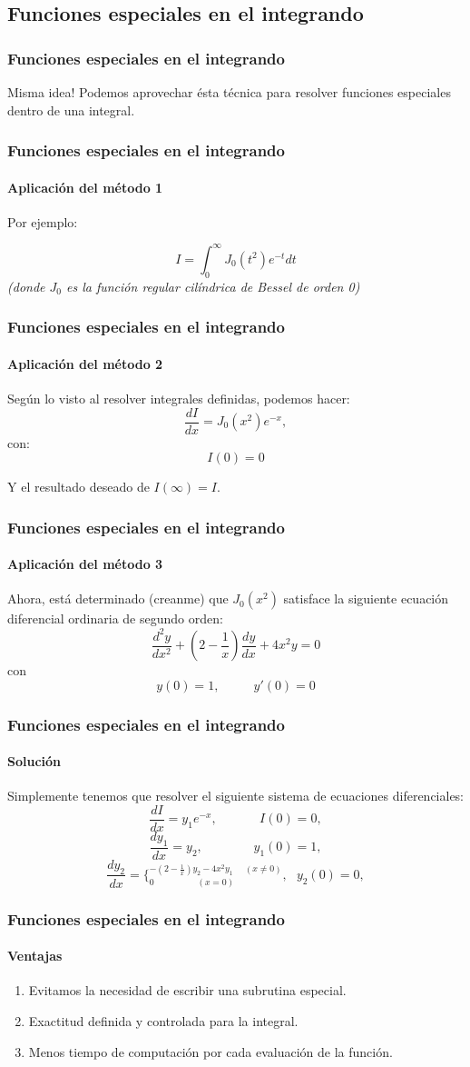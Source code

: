 \documentclass{beamer}
\begin{document}
\subsection{Funciones especiales en el integrando}
\frame
{
\frametitle{Funciones especiales en el integrando}

Misma idea!
Podemos aprovechar ésta técnica para resolver funciones especiales dentro de
una integral.

}
\frame
{
\frametitle{Funciones especiales en el integrando}
\framesubtitle{Aplicación del método 1}

Por ejemplo:

$$
	I	=	\int_0^\infty J_0 (t^2) e^{-t} dt
$$
\textit{(donde $J_0$ es la función regular cilíndrica de Bessel de orden 0)}\\

}
\frame
{
\frametitle{Funciones especiales en el integrando}
\framesubtitle{Aplicación del método 2}
Según lo visto al resolver integrales definidas, podemos hacer:
$$
	\frac{dI}{dx}	=	J_0 (x^2) e^{-x},
$$
con:
$$
	I(0) = 0
$$

Y el resultado deseado de $I(\infty) = I$.\\

}
\frame
{
\frametitle{Funciones especiales en el integrando}
\framesubtitle{Aplicación del método 3}
Ahora, está determinado (creanme) que $J_0(x^2)$ satisface la siguiente
ecuación diferencial ordinaria de segundo orden:
$$
	\frac{d^2y}{dx^2} + (2 - \frac{1}{x}) \frac{dy}{dx} + 4x^2y = 0
$$
con 
$$
	y(0) = 1, \ \ \ \ \ \ \ \ \ \ \ \  y'(0) = 0
$$

}
\frame
{
\frametitle{Funciones especiales en el integrando}
\framesubtitle{Solución}
Simplemente tenemos que resolver el siguiente sistema de ecuaciones
diferenciales:
$$
	\frac{dI}{dx} = y_1 e^{-x}, \ \ \ \ \ \ \ \ \ \ \ \ \ \ \ I(0) = 0,
$$
$$
	\frac{dy_1}{dx} = y_2 ,\ \ \ \ \ \ \ \ \ \ \ \ \ \ \ \ \ \ y_1(0) = 1,
$$
$$
	\frac{dy_2}{dx} = \{^{-(2-\frac{1}{x})y_2-4x^2y_1 \ \ \ \ \ \ (x \neq
0)}_{0 \ \ \ \ \ \ \ \ \ \ \ \ \ \ \ \ \ \ \ \ \ \ (x = 0)}, \ \ \ y_2(0) = 0,
$$
}
\frame
{
\frametitle{Funciones especiales en el integrando}
\framesubtitle{Ventajas}
\begin{enumerate}
	\item Evitamos la necesidad de escribir una subrutina especial.
	\item Exactitud definida y controlada para la integral.
	\item Menos tiempo de computación por cada evaluación de la función.
\end{enumerate}
}
\end{document}
